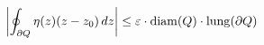 \documentclass[preview]{standalone}
\begin{document}
\begin{align*}
\special{dvisvgm:raw <g id='unique000'>}\left|\oint_{\partial Q} \eta(z)(z-z_0)\,dz\right| \le \varepsilon \cdot \mathrm{diam}(Q)\cdot \mathrm{lung}(\partial Q)\special{dvisvgm:raw </g>}
\end{align*}
\end{document}
